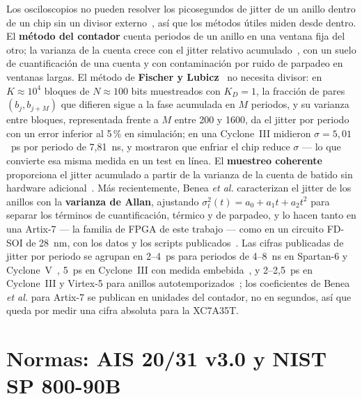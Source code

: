 Los osciloscopios no pueden resolver los picosegundos de jitter de un
anillo dentro de un chip sin un divisor externo~\cite{benea_2024_flicker},
así que los métodos útiles miden desde dentro. El \textbf{método del
contador} cuenta periodos de un anillo en una ventana fija del otro; la
varianza de la cuenta crece con el jitter relativo
acumulado~\cite{killmann_2008_design,
lubicz_2015_towards}, con un suelo de cuantificación de una cuenta y con
contaminación por ruido de parpadeo en ventanas largas. El método de
\textbf{Fischer y Lubicz}~\cite{fischer_2014_embedded} no necesita
divisor: en $K\approx10^4$ bloques de $N\approx100$ bits muestreados con
$K_D=1$, la fracción de pares $(b_j,b_{j+M})$ que difieren sigue a la
fase acumulada en $M$ periodos, y su varianza entre bloques, representada
frente a $M$ entre 200 y 1600, da el jitter por periodo con un error
inferior al 5\,\% en simulación; en una Cyclone~III midieron
$\sigma=5{,}01$~ps por periodo de 7,81~ns, y mostraron que enfriar el chip
reduce $\sigma$ --- lo que convierte esa misma medida en un test en
línea. El \textbf{muestreo coherente} proporciona el jitter acumulado a
partir de la varianza de la cuenta de batido sin hardware
adicional~\cite{peetermans_2021_configurable}. Más recientemente, Benea
\emph{et al.} caracterizan el jitter de los anillos con la
\textbf{varianza de Allan}, ajustando $\sigma_t^2(t)=a_0+a_1 t+a_2 t^2$
para separar los términos de cuantificación, térmico y de parpadeo, y lo
hacen tanto en una Artix-7 --- la familia de FPGA de este trabajo --- como
en un circuito FD-SOI de 28~nm, con los datos y los scripts
publicados~\cite{benea_2024_flicker}. Las cifras publicadas de jitter por
periodo se agrupan en 2--4~ps para periodos de 4--8~ns en Spartan-6 y
Cyclone~V~\cite{petura_2016_survey}, 5~ps en Cyclone~III con medida
embebida~\cite{fischer_2014_embedded}, y 2--2,5~ps en Cyclone~III y
Virtex-5 para anillos autotemporizados~\cite{cherkaoui_2013_very}; los
coeficientes de Benea \emph{et al.} para Artix-7 se publican en unidades
del contador, no en segundos, así que queda por medir una cifra absoluta
para la XC7A35T.

\section{Normas: AIS 20/31 v3.0 y NIST SP 800-90B}
\label{sec:soa_standards}

